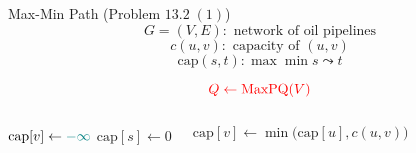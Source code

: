 \begin{frame}
  \begin{exampleblock}{Max-Min Path (Problem $13.2\; (1)$)}
    \[
      G = (V, E): \text{ network of oil pipelines}
    \]
    \[
      c(u,v): \text{ capacity of } (u,v)
    \]
    \[
      \text{cap}(s,t): \max \min s \leadsto t
    \]
    
    \vspace{0.30cm}
    \centerline{}
  \end{exampleblock}

  \pause
  \[
    \textcolor{red}{Q \gets \text{MaxPQ}(V)}
  \]

  \pause
  \begin{columns}
      \begin{algorithmic}
		  \State $\text{cap}[v] \gets \textcolor{teal}{-\infty}$
		\EndFor
		\State $\text{cap}[s] \gets 0$
      \end{algorithmic}
      \begin{algorithmic}
		  \State $\text{cap}[v] \gets \min\Big(\text{cap}[u], c(u,v)\Big)$
		\EndIf
      \end{algorithmic}
  \end{columns}
\end{frame}
